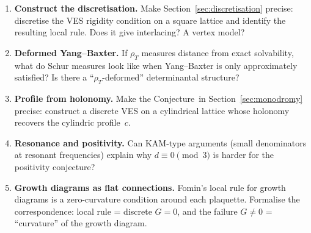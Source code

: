 \documentclass[11pt]{article}
\newcommand{\rhoT}{\rho_T}
\theoremstyle{plain}
\theoremstyle{definition}
\theoremstyle{remark}
\begin{document}
\begin{enumerate}
  \item \textbf{Construct the discretisation.} Make
    Section~\ref{sec:discretisation} precise: discretise the VES
    rigidity condition on a square lattice and identify the resulting
    local rule. Does it give interlacing? A vertex model?

  \item \textbf{Deformed Yang--Baxter.} If $\rhoT$ measures distance
    from exact solvability, what do Schur measures look like when
    Yang--Baxter is only approximately satisfied? Is there a
    ``$\rhoT$-deformed'' determinantal structure?

  \item \textbf{Profile from holonomy.} Make the
    Conjecture~in Section~\ref{sec:monodromy} precise: construct a
    discrete VES on a cylindrical lattice whose holonomy recovers the
    cylindric profile~$c$.

  \item \textbf{Resonance and positivity.} Can KAM-type arguments
    (small denominators at resonant frequencies) explain why
    $d\equiv 0\pmod{3}$ is harder for the positivity conjecture?

  \item \textbf{Growth diagrams as flat connections.} Fomin's local
    rule for growth diagrams is a zero-curvature condition around each
    plaquette. Formalise the correspondence: local rule = discrete
    $G=0$, and the failure $G\ne 0$ = ``curvature'' of the growth
    diagram.
\end{enumerate}


\end{document}
